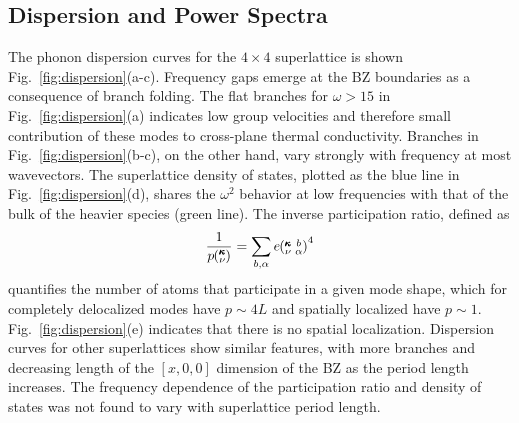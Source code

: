 \documentclass[aps,prb,preprint,preprintnumbers,amsmath,amssymb,floatfix,superscriptaddress]{revtex4}
\newcommand{\kvba}{\mspace{-4.0mu}\left(\mspace{-8.0mu}
\begin{smallmatrix} &\pmb{\kappa} &b \\ &\nu &\alpha\end{smallmatrix}
\mspace{-3.0mu}\right)}
\newcommand{\kv}{\mspace{-4.0mu}\left(\mspace{-8.0mu}
\begin{smallmatrix}&\pmb{\kappa} \\&\nu\end{smallmatrix}
\mspace{-3.0mu}\right)}
\begin{document}
\subsection{Dispersion and Power Spectra}

The phonon dispersion curves for the $4\times4$ superlattice is shown Fig.~\ref{fig:dispersion}(a-c). Frequency gaps emerge at the BZ boundaries as a consequence of branch folding.\cite{PhysRevB.38.1427,PhysRevB.60.2627} The flat branches for $\omega > 15$ in Fig.~\ref{fig:dispersion}(a) indicates low group velocities and therefore small contribution of these modes to cross-plane thermal conductivity. Branches in Fig.~\ref{fig:dispersion}(b-c), on the other hand, vary strongly with frequency at most wavevectors. The superlattice density of states, plotted as the blue line in Fig.~\ref{fig:dispersion}(d), shares the $\omega^2$ behavior at low frequencies with that of the bulk of the heavier species (green line). The inverse participation ratio, defined as 
\begin{equation}\label{EQ:P_ratio}
\begin{split}
\frac{1}{p\kv}=\sum_{b,\alpha}e\kvba^4
\end{split}
\end{equation}
quantifies the number of atoms that participate in a given mode shape, which for completely delocalized modes have $p\sim 4L$ and spatially localized have $p\sim 1$.\cite{PhysRevB.70.235214} Fig.~\ref{fig:dispersion}(e) indicates that there is no spatial localization.  Dispersion curves for other superlattices show similar features, with more branches and decreasing length of the $[x,0,0]$ dimension of the BZ as the period length increases. The frequency dependence of the participation ratio and density of states was not found to vary with superlattice period length.
\renewcommand{\topfraction}{0.7}
\begin{figure*}%
\begin{center}
\renewcommand{\figure}{Fig.}
\caption{Dispersion (a,b,c), density of states (d) and inverse participation ratio (e) of a $4\times4$ superlattice. Labeled gray squares represent select modes for Fig.~\ref{fig:sed}. $x$ corresponds to the components of the wavevector in the BZ. Orange lines correspond the bulk of the lighter species and green lines correspond to the bulk of the heavier species.}
\label{fig:dispersion}
\end{center}
\end{figure*}
\end{document}
